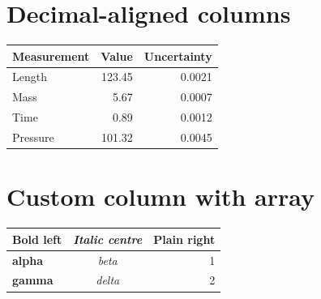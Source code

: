 \documentclass{article}
\begin{document}
\section{Decimal-aligned columns}

\begin{tabular}{l d{3.2} d{2.4}}
  \hline
  Measurement & Value & Uncertainty \\
  \hline
  Length    & 123.45  & 0.0021 \\
  Mass      &   5.67  & 0.0007 \\
  Time      &   0.89  & 0.0012 \\
  Pressure  & 101.32  & 0.0045 \\
  \hline
\end{tabular}

\section{Custom column with array}

\begin{tabular}{|>{\bfseries}l|>{\itshape}c|r|}
  \hline
  Bold left & Italic centre & Plain right \\
  \hline
  alpha & beta & 1 \\
  gamma & delta & 2 \\
  \hline
\end{tabular}
\end{document}
